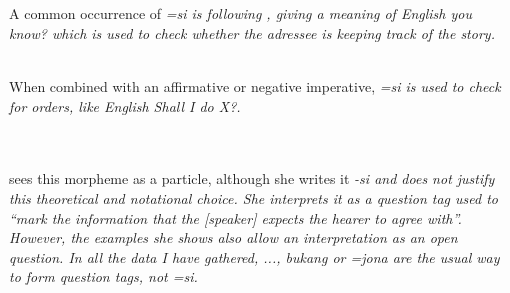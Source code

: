  \\ \\



A common occurrence of \em =si \em is following , giving a meaning of English \em you know? \em which is used to check whether the adressee is keeping track of the story.

 \\
When combined with an affirmative or negative imperative, \em =si \em is used to check for orders, like English \em Shall I do X?\em.

 \\

 \\



\citet{Jayasuriya2002} sees this morpheme as a particle, although she writes it \em -si \em and does not justify this theoretical and notational choice. She interprets it as a question tag used to ``mark the information that the [speaker] expects the hearer to agree with''. However, the examples she shows also allow an interpretation as an open question. In all the data I have gathered, \em ..., bukang \em {} or \em =jona \em {} are the usual way to form question tags, not \em =si\em.

